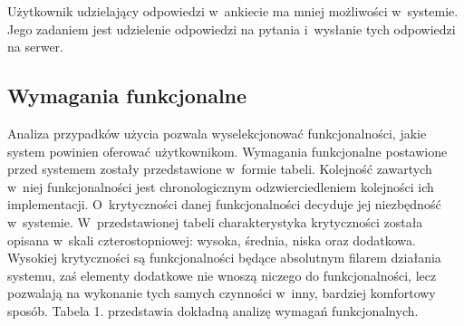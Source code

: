 \documentclass[12pt,a4paper,notitlepage]{article}
\begin{document}
Użytkownik udzielający odpowiedzi w~ankiecie ma mniej możliwości w~systemie. Jego zadaniem jest udzielenie odpowiedzi na pytania i~wysłanie tych odpowiedzi na serwer.

\subsection{Wymagania funkcjonalne}
Analiza przypadków użycia pozwala wyselekcjonować funkcjonalności, jakie system powinien oferować użytkownikom. Wymagania funkcjonalne postawione przed systemem zostały przedstawione w~formie tabeli. Kolejność zawartych w~niej funkcjonalności jest chronologicznym odzwierciedleniem kolejności ich implementacji. O~krytyczności danej funkcjonalności decyduje jej niezbędność w~systemie. W~przedstawionej tabeli charakterystyka krytyczności została opisana w~skali czterostopniowej: wysoka, średnia, niska oraz dodatkowa. Wysokiej krytyczności są funkcjonalności będące absolutnym filarem działania systemu, zaś elementy dodatkowe nie wnoszą niczego do funkcjonalności, lecz pozwalają na wykonanie tych samych czynności w~inny, bardziej komfortowy sposób. Tabela 1. przedstawia dokładną analizę wymagań funkcjonalnych.
\end{document}
